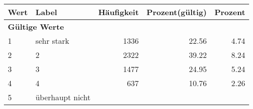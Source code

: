      \begin{longtable}{lXrrr}
     \toprule
     \textbf{Wert} & \textbf{Label} & \textbf{Häufigkeit} & \textbf{Prozent(gültig)} & \textbf{Prozent} \\
     \endhead
     \midrule
     \multicolumn{5}{l}{\textbf{Gültige Werte}}\\

     1 &
     \multicolumn{1}{X}{ sehr stark   } &


       \num{1336} &
       \num[round-mode=places,round-precision=2]{22,56} &
         \num[round-mode=places,round-precision=2]{4,74} \\

     2 &
     \multicolumn{1}{X}{ 2   } &


       \num{2322} &
       \num[round-mode=places,round-precision=2]{39,22} &
         \num[round-mode=places,round-precision=2]{8,24} \\

     3 &
     \multicolumn{1}{X}{ 3   } &


       \num{1477} &
       \num[round-mode=places,round-precision=2]{24,95} &
         \num[round-mode=places,round-precision=2]{5,24} \\

     4 &
     \multicolumn{1}{X}{ 4   } &


       \num{637} &
       \num[round-mode=places,round-precision=2]{10,76} &
         \num[round-mode=places,round-precision=2]{2,26} \\

     5 &
     \multicolumn{1}{X}{ überhaupt nicht   } &



\end{longtable}
